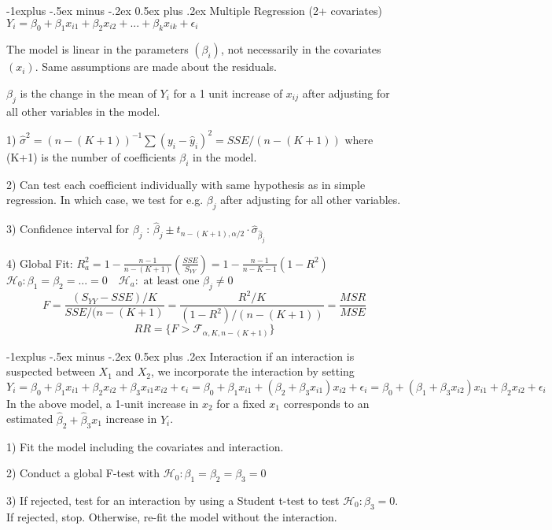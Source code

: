 \documentclass[8pt,landscape]{extarticle}
\makeatletter
\renewcommand{\subsection}{\@startsection{subsection}{2}{0mm}%
                                {-1explus -.5ex minus -.2ex}%
                                {0.5ex plus .2ex}%
                                {\normalfont\normalsize\bfseries}}
\makeatother
\begin{document}
\begin{multicols}{3}
\subsection{Multiple Regression (2+ covariates)}
$Y_i = \beta_0 + \beta_1 x_{i1} + \beta_2 x_{i2} + ... + \beta_k x_{ik} + \epsilon_i$

The model is linear in the parameters $(\beta_i)$, not necessarily in the covariates $(x_i)$. Same assumptions are made about the residuals. 

$\beta_j$ is the change in the mean of $Y_i$ for a 1 unit increase of $x_{ij}$ after adjusting for all other variables in the model.

1) $\hat{\sigma}^2 = (n - (K+1)) ^{-1} \sum (y_i -\hat{y}_i)^2 = SSE/(n-(K+1))$ where (K+1) is the number of coefficients $\beta_i$ in the model. 

2) Can test each coefficient individually with same hypothesis as in simple regression. In which case, we test for e.g. $\beta_j$ after adjusting for all other variables.

3) Confidence interval for $\beta_j$ : $\hat{\beta}_j \pm t_{n-(K+1), \alpha/2} \cdot \hat{\sigma}_{\hat{\beta}_j}$

4) Global Fit: $R^2_a = 1 - \frac{n-1}{n-(K+1)}\left(\frac{SSE}{S_{YY}}\right) = 1 - \frac{n-1}{n-K-1}(1-R^2) $
$\mathcal{H}_0 : \beta_1 = \beta_2 = ... = 0 \quad \mathcal{H}_a : \text{ at least one } \beta_j \neq 0$
$$F = \frac{(S_{YY} - SSE ) /K }{SSE/(n-(K+1)} = \frac{R^2/ K}{(1-R^2)/(n-(K+1))} = \frac{MSR}{MSE}$$
$$RR= \{F> \mathcal{F}_{\alpha, K, n-(K+1)} \}$$

\subsection{Interaction}
if an interaction is suspected between $X_1$ and $X_2$, we incorporate the interaction by setting
$
Y_i = \beta_0 + \beta_1x_{i1} + \beta_2x_{i2} + \beta_3 x_{i1} x_{i2} + \epsilon_i
	= \beta_0 + \beta_1x_{i1} +(\beta_2 + \beta_3x_{i1})x_{i2} + \epsilon_i
	= \beta_0 + (\beta_1 +\beta_3x_{i2})x_{i1} + \beta_2 x_{i2}+ \epsilon_i 
$
In the above model, a 1-unit increase in $x_2$ for a fixed $x_1$ corresponds to an estimated $\hat{\beta}_2 + \hat{\beta}_3 x_1$ increase in $Y_i$.

1) Fit the model including the covariates and interaction.

2) Conduct a global F-test with $\mathcal{H}_0 : \beta_1 = \beta_2 = \beta_3 = 0$

3) If rejected, test for an interaction by using a Student t-test to test $\mathcal{H}_0 : \beta_3 = 0$. If rejected, stop. Otherwise, re-fit the model without the interaction.


\end{multicols}
\end{document}
